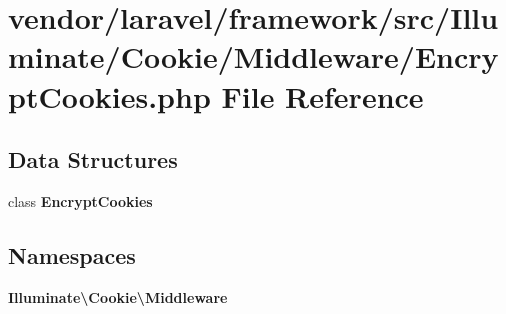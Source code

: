 \section{vendor/laravel/framework/src/\+Illuminate/\+Cookie/\+Middleware/\+Encrypt\+Cookies.php File Reference}
\label{_encrypt_cookies_8php}
\subsection*{Data Structures}
\begin{DoxyCompactItemize}
\item 
class {\bf Encrypt\+Cookies}
\end{DoxyCompactItemize}
\subsection*{Namespaces}
\begin{DoxyCompactItemize}
\item 
 {\bf Illuminate\textbackslash{}\+Cookie\textbackslash{}\+Middleware}
\end{DoxyCompactItemize}
